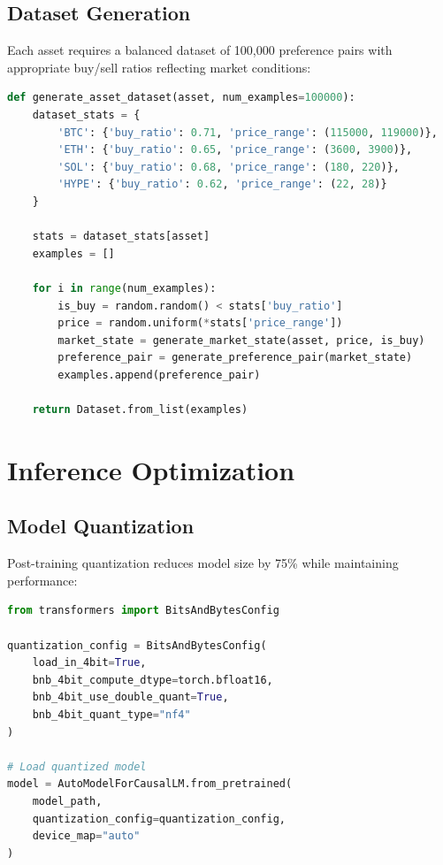 \documentclass{report}
\begin{document}
\subsection{Dataset Generation}

Each asset requires a balanced dataset of 100,000 preference pairs with appropriate buy/sell ratios reflecting market conditions:

\begin{lstlisting}[language=Python, caption=Dataset statistics generation]
def generate_asset_dataset(asset, num_examples=100000):
    dataset_stats = {
        'BTC': {'buy_ratio': 0.71, 'price_range': (115000, 119000)},
        'ETH': {'buy_ratio': 0.65, 'price_range': (3600, 3900)},
        'SOL': {'buy_ratio': 0.68, 'price_range': (180, 220)},
        'HYPE': {'buy_ratio': 0.62, 'price_range': (22, 28)}
    }
    
    stats = dataset_stats[asset]
    examples = []
    
    for i in range(num_examples):
        is_buy = random.random() < stats['buy_ratio']
        price = random.uniform(*stats['price_range'])
        market_state = generate_market_state(asset, price, is_buy)
        preference_pair = generate_preference_pair(market_state)
        examples.append(preference_pair)
    
    return Dataset.from_list(examples)
\end{lstlisting}

\section{Inference Optimization}

\subsection{Model Quantization}

Post-training quantization reduces model size by 75\% while maintaining performance:

\begin{lstlisting}[language=Python, caption=4-bit quantization implementation]
from transformers import BitsAndBytesConfig

quantization_config = BitsAndBytesConfig(
    load_in_4bit=True,
    bnb_4bit_compute_dtype=torch.bfloat16,
    bnb_4bit_use_double_quant=True,
    bnb_4bit_quant_type="nf4"
)

# Load quantized model
model = AutoModelForCausalLM.from_pretrained(
    model_path,
    quantization_config=quantization_config,
    device_map="auto"
)
\end{lstlisting}
\end{document}
